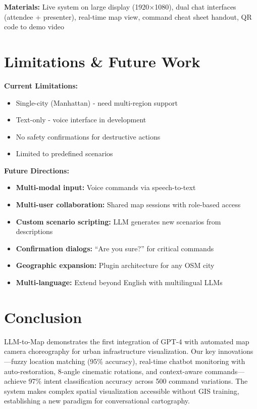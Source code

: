 \documentclass[sigconf]{acmart}
\begin{document}
\textbf{Materials:} Live system on large display (1920×1080), dual chat interfaces (attendee + presenter), real-time map view, command cheat sheet handout, QR code to demo video

\section{Limitations \& Future Work}

\textbf{Current Limitations:}
\begin{itemize}
    \item Single-city (Manhattan) - need multi-region support
    \item Text-only - voice interface in development
    \item No safety confirmations for destructive actions
    \item Limited to predefined scenarios
\end{itemize}

\textbf{Future Directions:}
\begin{itemize}
    \item \textbf{Multi-modal input:} Voice commands via speech-to-text
    \item \textbf{Multi-user collaboration:} Shared map sessions with role-based access
    \item \textbf{Custom scenario scripting:} LLM generates new scenarios from descriptions
    \item \textbf{Confirmation dialogs:} ``Are you sure?'' for critical commands
    \item \textbf{Geographic expansion:} Plugin architecture for any OSM city
    \item \textbf{Multi-language:} Extend beyond English with multilingual LLMs
\end{itemize}

\section{Conclusion}

LLM-to-Map demonstrates the first integration of GPT-4 with automated map camera choreography for urban infrastructure visualization. Our key innovations—fuzzy location matching (95\% accuracy), real-time chatbot monitoring with auto-restoration, 8-angle cinematic rotations, and context-aware commands—achieve 97\% intent classification accuracy across 500 command variations. The system makes complex spatial visualization accessible without GIS training, establishing a new paradigm for conversational cartography.
\end{document}
